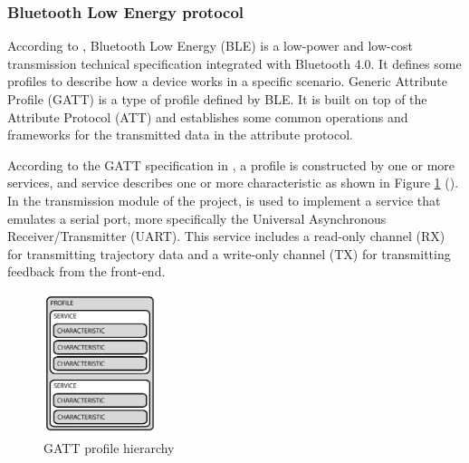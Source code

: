 \subsubsection{Bluetooth Low Energy protocol}
According to \textcite{bluetooth}, Bluetooth Low Energy (BLE) is a low-power and low-cost transmission technical specification integrated with Bluetooth 4.0. It defines some profiles to describe how a device works in a specific scenario. Generic Attribute Profile (GATT) is a type of profile defined by BLE. It is built on top of the Attribute Protocol (ATT) and establishes some common operations and frameworks for the transmitted data in the attribute protocol.
\par
According to the GATT specification in \textcite{bluetooth}, a profile is constructed by one or more services, and service describes one or more characteristic as shown in Figure \ref{fig:gatt}  (\textcite{ble}). In the transmission module of the project, \textcite{nus} is used to implement a service that emulates a serial port, more specifically the Universal Asynchronous Receiver/Transmitter (UART). This service includes a read-only channel (RX) for transmitting trajectory data and a write-only channel (TX) for transmitting feedback from the front-end. 
\begin{figure}[H]
    \centering
    \includegraphics[width=0.3\textwidth]{figure/gatt.jpg}
    \caption{GATT profile hierarchy}
    \label{fig:gatt}
\end{figure}


